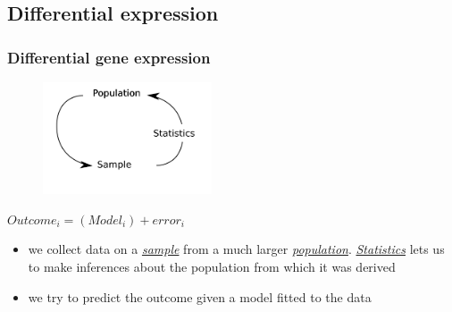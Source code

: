 \documentclass{beamer}\usepackage[]{graphicx}\usepackage[]{color}
\begin{document}
\subsection{Differential expression}
\begin{frame}
\frametitle{Differential gene expression}
\begin{center}
\begin{figure}
\includegraphics[width=5cm]{Images/stats.png}
\end{figure}
$Outcome_i=(Model_i)+error_i$
\end{center}
\begin{itemize}
\footnotesize
\item we collect data on a \underline{\textit{sample}} from a much larger \underline{\textit{population}}. \underline{\textit{Statistics}} lets us to make inferences about the population from which it was derived
\item we try to predict the outcome given a model fitted to the data
\end{itemize}
\end{frame}
\end{document}
